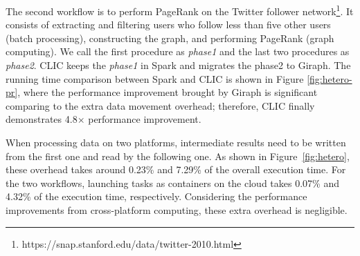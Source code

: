 The second workflow is to perform PageRank on the Twitter follower network\footnote{https://snap.stanford.edu/data/twitter-2010.html}. It consists of extracting and filtering users who follow less than five other users (batch processing), constructing the graph, and performing PageRank (graph computing). We call the first procedure as \textit{phase1} and the last two procedures as \textit{phase2}. CLIC keeps the \textit{phase1} in Spark and migrates the phase2 to Giraph. The running time comparison between Spark and CLIC is shown in Figure \ref{fig:hetero-pr}, where the performance improvement brought by Giraph is significant comparing to the extra data movement overhead; therefore, CLIC finally demonstrates 4.8$\times$ performance improvement.

When processing data on two platforms, intermediate results need to be written from the first one and read by the following one. As shown in Figure~\ref{fig:hetero}, these overhead takes around 0.23\% and 7.29\% of the overall execution time. For the two workflows, launching tasks as containers on the cloud takes 0.07\% and 4.32\% of the execution time, respectively. Considering the performance improvements from cross-platform computing, these extra overhead is negligible. 

